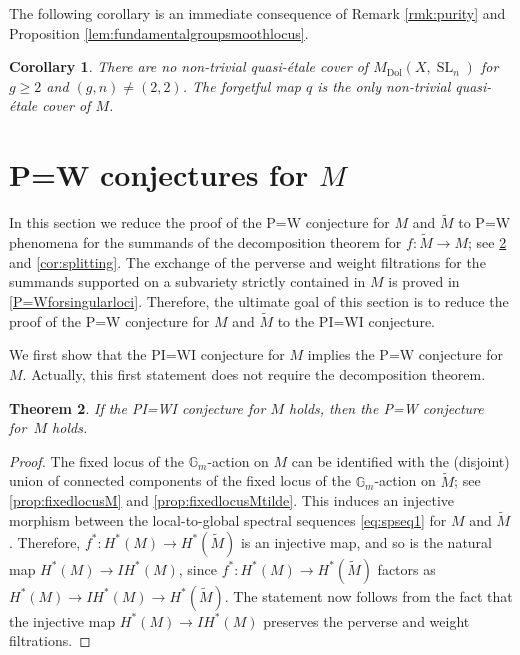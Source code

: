 \documentclass[JEP,XML,SOM,Unicode, NoEqCountersInSection,NoFloatCountersInSection,published]{cedram}
\newcommand{\IH}{\mathit{IH}}
\newtheorem{thm}{Theorem}[section]
\newtheorem{cor}[thm]{Corollary}
\theoremstyle{definition}
\newcommand{\Gm}{\mathbb{G}_m}
\newcommand{\Sl}{\operatorname{SL}}
\newcommand{\MDolSl}{{M}_{\mathrm{Dol}}(X, \Sl_n)}
\begin{document}
The following corollary is an immediate consequence of Remark \ref{rmk:purity} and Proposition \ref{lem:fundamentalgroupsmoothlocus}.

\begin{cor}
There are no non-trivial quasi-étale cover of $\MDolSl$ for $g \geq 2$ and $(g,n) \neq (2,2)$. The forgetful map $q$ is the only non-trivial quasi-étale cover of $M$.
\end{cor}
\section{P=W conjectures for \texorpdfstring{$M$}{M}}\label{sec:P=W2}

In this section we
reduce the proof of the P=W conjecture for $M$ and $\widetilde{M}$ to P=W phenomena for the summands of the decomposition theorem for $f\colon \widetilde{M} \to M$; see \cref{P=W and PI=WI} and \cref{cor:splitting}. The exchange of the perverse and weight filtrations for the summands supported on a subvariety strictly contained in $M$ is proved in \cref{P=Wforsingularloci}. Therefore, the ultimate goal of this section is to reduce the proof of the P=W conjecture for $M$ and $\widetilde{M}$ to the PI=WI conjecture.

We first show that the PI=WI conjecture for $M$ implies the P=W conjecture for~$M$. Actually, this first statement does not require the decomposition theorem.

\begin{thm}\label{P=W and PI=WI}
If the PI=WI conjecture for $M$ holds, then the P=W conjecture for~$M$ holds.
\end{thm}
\begin{proof}
The fixed locus of the $\Gm$\nobreakdash-action on $M$ can be identified with the (disjoint) union of connected components of the fixed locus of the $\Gm$\nobreakdash-action on $\widetilde{M}$; see \cref{prop:fixedlocusM} and \cref{prop:fixedlocusMtilde}. This induces an injective morphism between the local-to-global spectral sequences \eqref{eq:spseq1} for $M$ and $\widetilde{M}$. Therefore, $f^*\colon H^*(M) \to H^*(\widetilde{M})$ is an injective map, and so is the natural map $H^*(M) \to \IH^*(M)$, since $f^*\colon H^*(M) \to H^*(\widetilde{M})$ factors as $H^*(M) \to \IH^*(M) \to H^*(\widetilde{M})$. The statement now follows from the fact that the injective map $H^*(M) \to \IH^*(M)$ preserves the perverse and weight filtrations.
\end{proof}
\end{document}
